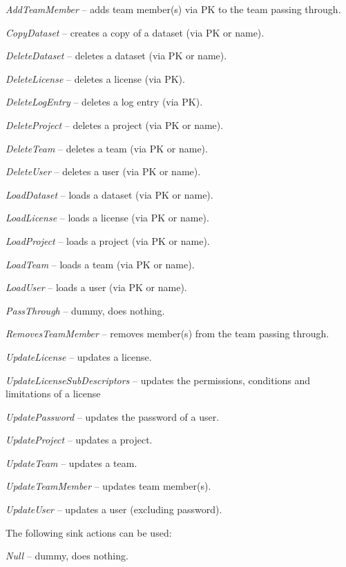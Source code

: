 \documentclass[a4paper]{book}
\begin{document}
\begin{tight_itemize}
  \item \textit{AddTeamMember} -- adds team member(s) via PK to the team passing through.
  \item \textit{CopyDataset} -- creates a copy of a dataset (via PK or name).
  \item \textit{DeleteDataset} -- deletes a dataset (via PK or name).
  \item \textit{DeleteLicense} -- deletes a license (via PK).
  \item \textit{DeleteLogEntry} -- deletes a log entry (via PK).
  \item \textit{DeleteProject} -- deletes a project (via PK or name).
  \item \textit{DeleteTeam} -- deletes a team (via PK or name).
  \item \textit{DeleteUser} -- deletes a user (via PK or name).
  \item \textit{LoadDataset} -- loads a dataset (via PK or name).
  \item \textit{LoadLicense} -- loads a license (via PK or name).
  \item \textit{LoadProject} -- loads a project (via PK or name).
  \item \textit{LoadTeam} -- loads a team (via PK or name).
  \item \textit{LoadUser} -- loads a user (via PK or name).
  \item \textit{PassThrough} -- dummy, does nothing.
  \item \textit{RemovesTeamMember} -- removes member(s) from the team passing through.
  \item \textit{UpdateLicense} -- updates a license.
  \item \textit{UpdateLicenseSubDescriptors} -- updates the permissions, conditions and limitations of a license
  \item \textit{UpdatePassword} -- updates the password of a user.
  \item \textit{UpdateProject} -- updates a project.
  \item \textit{UpdateTeam} -- updates a team.
  \item \textit{UpdateTeamMember} -- updates team member(s).
  \item \textit{UpdateUser} -- updates a user (excluding password).
\end{tight_itemize}
The following sink actions can be used:
\begin{tight_itemize}
  \item \textit{Null} -- dummy, does nothing.
\end{tight_itemize}
\end{document}
